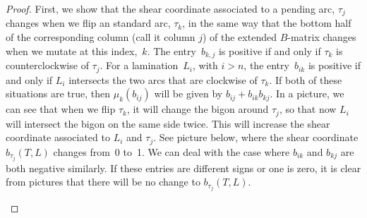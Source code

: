 \begin{proof}First, we show that the shear coordinate associated to a pending arc, $\tau_j$ changes when we flip an standard arc, $\tau_k$, in the same way that the bottom half of the corresponding column (call it column $j$) of the extended
$B$-matrix changes when we mutate at this index,~$k$. The entry~$b_{k,j}$ is positive if and only if $\tau_k$ is counterclockwise of $\tau_j$. For a lamination~$L_i$, with $i > n$, the entry~$b_{ik}$ is positive if and only if $L_i$ intersects the two arcs that are clockwise of $\tau_k$. If both of these situations are true, then $\mu_k(b_{ij})$ will be given by $b_{ij} + b_{ik}b_{kj}$. In a picture, we can see that when we flip $\tau_k$, it will change the bigon around $\tau_j$, so that now $L_i$ will intersect the bigon on the same side twice. This will increase the shear coordinate associated to $L_i$ and $\tau_j$. See picture below, where the shear coordinate $b_{\tau_j}(T, L)$ changes from~0 to~1. We can deal with the case where $b_{ik}$ and $b_{kj}$ are both negative similarly. If these entries are different signs or one is zero, it is clear from pictures that there will be no change to $b_{\tau_j}(T,L)$.

\begin{center}
\end{center}
\end{proof}
